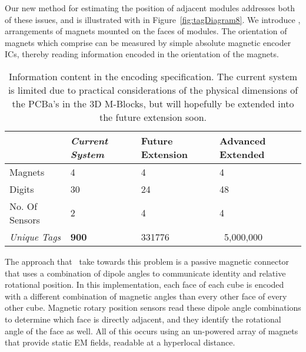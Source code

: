  Our new method for estimating the position of adjacent modules addresses both of these issues, and is illustrated with in Figure~\ref{fig:tagDiagram8}.  We introduce \tagNamePlural, arrangements of magnets mounted on the faces of modules.  The orientation of magnets which comprise \tagNamePlural can be measured by simple absolute magnetic encoder ICs, thereby reading information encoded in the orientation of the magnets.

\begin{table}[b]
	\caption{Information content in the \TagNamePlural encoding specification. The current system is limited due to practical considerations of the physical dimensions of the  PCBa's in the 3D M-Blocks, but will hopefully be extended into the future extension soon.}
	
	\begin{tabular}{ p{2cm}  p{1.5cm}  p{1.5cm}  p{1.5cm}}
		\hline
								& \textit{Current System} & Future Extension & Advanced Extended \\
		\hline
				\addlinespace[1ex]
		Magnets  				& 4 			 &	4				&	4	\\
		Digits 					& 30 			 &	24				&	48	\\
		No. Of Sensors 			& 2 			 &	4				&	4	\\
		\textit{Unique Tags} 	& \textbf{900} 	 & 331776			& 	~5,000,000\\
		
	\end{tabular}
	
	\label{tab:hardwareOverview}
\end{table}

The approach that \tagNamePlural~take towards this problem is a passive magnetic connector that uses a combination of dipole angles to communicate identity and relative rotational position. In this implementation, each face of each cube is encoded with a different combination of magnetic angles than every other face of every other cube. Magnetic rotary position sensors read these dipole angle combinations to determine which face is directly adjacent, and they identify the rotational angle of the face as well. All of this occurs using an un-powered array of magnets that provide static EM fields, readable at a hyperlocal distance.

